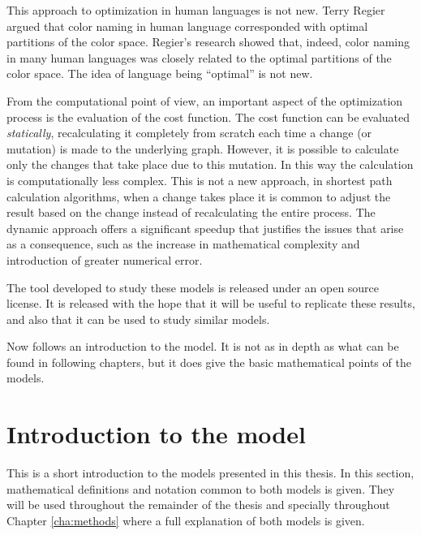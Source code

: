 This approach to optimization in human languages is not new.
Terry Regier argued \cite{Regier2007a} that color naming in human language corresponded with optimal partitions of the color space.
Regier's research showed that, indeed, color naming in many human languages was closely related to the optimal partitions of the color space.
The idea of language being ``optimal'' is not new.

From the computational point of view, an important aspect of the optimization process is the evaluation of the cost function.
The cost function can be evaluated \emph{statically}, recalculating it completely from scratch each time a change (or mutation) is made to the underlying graph.
However, it is possible to calculate only the changes that take place due to this mutation.
In this way the calculation is computationally less complex.
This is not a new approach, in shortest path calculation algorithms, when a change takes place it is common to adjust the result based on the change instead of recalculating the entire process. \cite{Buriol2003a}
The dynamic approach offers a significant speedup that justifies the issues that arise as a consequence, such as the increase in mathematical complexity and introduction of greater numerical error.


The tool developed to study these models is released under an open source license.
It is released with the hope that it will be useful to replicate these results, and also that it can be used to study similar models.


Now follows an introduction to the model.
It is not as in depth as what can be found in following chapters, but it does give the basic mathematical points of the models.

\section{Introduction to the model}
\label{sec:introduction_model}

This is a short introduction to the models presented in this thesis.
In this section, mathematical definitions and notation common to both models is given.
They will be used throughout the remainder of the thesis and specially throughout Chapter \ref{cha:methods} where a full explanation of both models is given.

